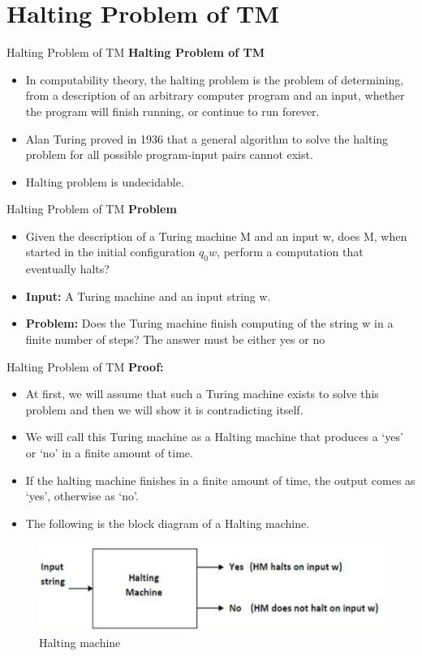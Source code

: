 \documentclass{beamer}
\begin{document}
\section{Halting Problem of TM}
\begin{frame}{Halting Problem of TM}
\textbf{Halting Problem of TM}
\begin{itemize}
	\item In computability theory, the halting problem is the problem of determining,
	from a description of an arbitrary computer program and an input, whether the
	program will finish running, or continue to run forever.
\item Alan Turing proved in 1936 that a general algorithm to solve the halting
	problem for all possible program-input pairs cannot exist.
\item Halting problem is undecidable.
\end{itemize}
\end{frame}
\begin{frame}{Halting Problem of TM}
	\textbf{Problem}
	\begin{itemize}
		\item Given the description of a Turing machine M and an input w, does M, when
		started in the initial configuration $q_0w$, perform a computation that eventually
		halts?
		\item \textbf{Input:}  A Turing machine and an input string w.
		\item \textbf{Problem:} Does the Turing machine finish computing of the string w in a finite	number of steps? The answer must be either yes or no
	\end{itemize}
\end{frame}
\begin{frame}{Halting Problem of TM}
	\textbf{Proof:}
	\begin{itemize}
		\item At first, we will assume that such a Turing machine exists to solve
		this problem and then we will show it is contradicting itself.
		\item We will call this Turing machine as a Halting machine that produces a
		‘yes’ or ‘no’ in a finite amount of time.
		\item If the halting machine finishes in a finite amount of time, the output comes
		as ‘yes’, otherwise as ‘no’.
		\item The following is the block diagram of a Halting machine.
	\end{itemize}
\begin{figure}
	\includegraphics[scale=.5]{img5/m26}
	\caption{Halting machine}
\end{figure}
\end{frame}
\end{document}

